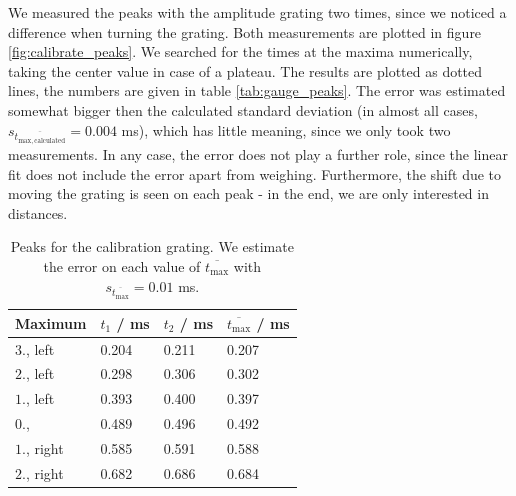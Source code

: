 We measured the peaks with the amplitude grating two times, since we noticed a difference when turning the grating. 
Both measurements are plotted in figure \ref{fig:calibrate_peaks}. 
We searched for the times at the maxima numerically, taking the center value in case of a plateau. 
The results are plotted as dotted lines, the numbers are given in table \ref{tab:gauge_peaks}. 
The error was estimated somewhat bigger then the calculated standard deviation (in almost 
    all cases, $s_{\overline{t_\mathrm{max, calculated}}}  = 0.004$ ms), which has little meaning, 
since we only took two measurements. In any case, the error does not play a further role, 
since the linear fit does not include the error apart from weighing. Furthermore, the 
shift due to moving the grating is seen on each peak - in the 
end, we are only interested in distances.  
\renewcommand{\arraystretch}{1.5}
\begin{table}[htdp]
    \centering
    \begin{tabular}{|p{3cm}|p{2cm}|p{2cm}|p{2cm}|}
        \hline
        \rowcolor{LightCyan}
        Maximum & $t_1$ / ms & $t_2$  / ms & $\overline{t_\mathrm{max}}$ / ms \\ \hline
        $3.$, left  & 0.204     & 0.211 & 0.207 \\
        $2.$, left  & 0.298     & 0.306 & 0.302 \\
        $1.$, left  & 0.393     & 0.400 & 0.397 \\
        $0.$,       & 0.489     & 0.496 & 0.492 \\
        $1.$, right & 0.585     & 0.591 & 0.588 \\
        $2.$, right & 0.682     & 0.686 & 0.684 \\
        \hline
    \end{tabular}
    \caption{
        Peaks for the calibration grating. We estimate the error on each 
        value of $\overline{t_\mathrm{max}}$ with 
        $s_{\overline{t_\mathrm{max}}} = 0.01$ ms.
        }
    \label{tab:calibrate_peaks}
\end{table}
